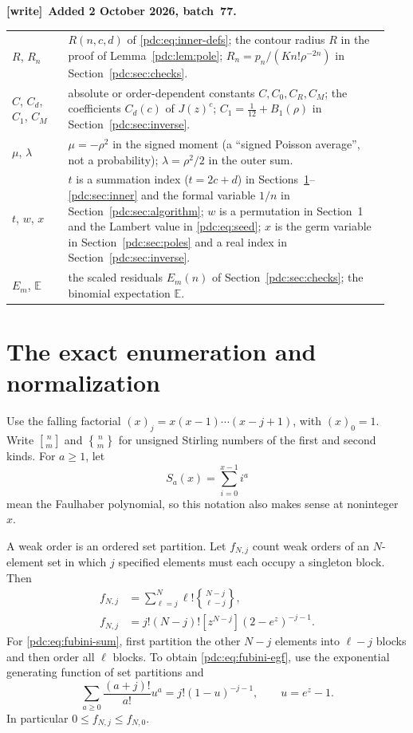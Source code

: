 \documentclass[11pt,letterpaper]{article}
\theoremstyle{remark}\newtheorem{remark}[theorem]{Remark}
\newcommand{\fall}[2]{(#1)_{#2}}
\newcommand{\stirone}[2]{\genfrac{[}{]}{0pt}{}{#1}{#2}}
\newcommand{\stirtwo}[2]{\genfrac{\{} {\}}{0pt}{}{#1}{#2}}
\newcommand{\E}{\mathbb E}
\newcommand{\coef}[2]{[#1^{#2}]}
\newenvironment{writenote}[1][]{\par\smallskip\begingroup\small
 \noindent\textbf{[write]}\if\relax\detokenize{#1}\relax\else~\textbf{#1.}\fi\ }%
 {\par\endgroup\smallskip}
\begin{document}
\begin{writenote}[Added 2 October 2026, batch~77]
\begin{center}
\begin{tabular}{@{}p{0.14\linewidth}p{0.80\linewidth}@{}}
$R$, $R_n$ & $R(n,c,d)$ of \eqref{pdc:eq:inner-defs}; the contour radius $R$ in the proof of Lemma~\ref{pdc:lem:pole}; $R_n=p_n/(Kn!\rho^{-2n})$ in Section~\ref{pdc:sec:checks}.\\
$C$, $C_d$, $C_1$, $C_M$ & absolute or order-dependent constants $C,C_0,C_R,C_M$; the coefficients $C_d(c)$ of $J(z)^c$; $C_1=\tfrac1{12}+B_1(\rho)$ in Section~\ref{pdc:sec:inverse}.\\
$\mu$, $\lambda$ & $\mu=-\rho^2$ in the signed moment (a ``signed Poisson average'', not a probability); $\lambda=\rho^2/2$ in the outer sum.\\
$t$, $w$, $x$ & $t$ is a summation index ($t=2c+d$) in Sections~\ref{pdc:sec:exact}--\ref{pdc:sec:inner} and the formal variable $1/n$ in Section~\ref{pdc:sec:algorithm}; $w$ is a permutation in Section~1 and the Lambert value in \eqref{pdc:eq:seed}; $x$ is the germ variable in Section~\ref{pdc:sec:poles} and a real index in Section~\ref{pdc:sec:inverse}.\\
$E_m$, $\E$ & the scaled residuals $E_m(n)$ of Section~\ref{pdc:sec:checks}; the binomial expectation $\E$.\\
\bottomrule
\end{tabular}
\end{center}
\end{writenote}

\section{The exact enumeration and normalization}
\label{pdc:sec:exact}
Use the falling factorial $\fall{x}{j}=x(x-1)\cdots(x-j+1)$, with $\fall{x}{0}=1$. Write $\stirone{n}{m}$ and $\stirtwo{n}{m}$ for unsigned Stirling numbers of the first and second kinds. For $a\geq1$, let
\[
 S_a(x)=\sum_{i=0}^{x-1}i^a
\]
mean the Faulhaber polynomial, so this notation also makes sense at noninteger $x$.

A weak order is an ordered set partition. Let $f_{N,j}$ count weak orders of an $N$-element set in which $j$ specified elements must each occupy a singleton block. Then
\begin{align}
 f_{N,j}&=\sum_{\ell=j}^{N}\ell!\stirtwo{N-j}{\ell-j},\label{pdc:eq:fubini-sum}\\
 f_{N,j}&=j!(N-j)!\coef{z}{N-j}(2-e^z)^{-j-1}.\label{pdc:eq:fubini-egf}
\end{align}
For \eqref{pdc:eq:fubini-sum}, first partition the other $N-j$ elements into $\ell-j$ blocks and then order all $\ell$ blocks. To obtain \eqref{pdc:eq:fubini-egf}, use the exponential generating function of set partitions and
\[
 \sum_{a\geq0}\frac{(a+j)!}{a!}u^a=j!(1-u)^{-j-1},\qquad u=e^z-1.
\]
In particular $0\leq f_{N,j}\leq f_{N,0}$.
\end{document}
